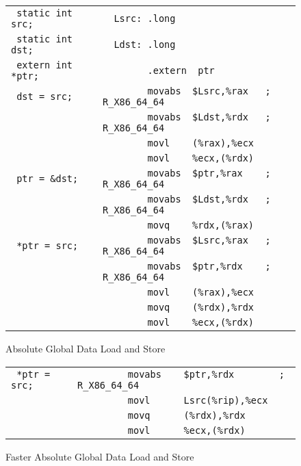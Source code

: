 \begin{figure}[H]
\Hrule
\caption{Absolute Global Data Load and Store}\label{large_abs_data_load_store}
\begin{center}
\begin{footnotesize}
\begin{tabular}{|l|l|}
\hline
\verb# static int src;  # & \verb#  Lsrc: .long                # \\
\verb# static int dst;  # & \verb#  Ldst: .long                # \\
\verb# extern int *ptr; # & \verb#        .extern  ptr         # \\
\hline
\verb# dst = src;       # & \verb#        movabs  $Lsrc,%rax   ; R_X86_64_64 # \\
\verb#                  # & \verb#        movabs  $Ldst,%rdx   ; R_X86_64_64 # \\
\verb#                  # & \verb#        movl    (%rax),%ecx  # \\
\verb#                  # & \verb#        movl    %ecx,(%rdx)  # \\
\hline
\verb# ptr = &dst;      # & \verb#        movabs  $ptr,%rax    ; R_X86_64_64 # \\
\verb#                  # & \verb#        movabs  $Ldst,%rdx   ; R_X86_64_64 # \\
\verb#                  # & \verb#        movq    %rdx,(%rax)  # \\
\hline
\verb# *ptr = src;      # & \verb#        movabs  $Lsrc,%rax   ; R_X86_64_64 # \\
\verb#                  # & \verb#        movabs  $ptr,%rdx    ; R_X86_64_64 # \\
\verb#                  # & \verb#        movl    (%rax),%ecx  # \\
\verb#                  # & \verb#        movq    (%rdx),%rdx  # \\ 
\verb#                  # & \verb#        movl    %ecx,(%rdx)  # \\
\hline
\end{tabular}
\end{footnotesize}
\end{center}
\end{figure}
            
\begin{figure}[H]
\Hrule
\caption{Faster Absolute Global Data Load and Store}
\label{large_rip_rel_addr_abs}
\begin{center}
\begin{footnotesize}
\begin{tabular}{|l|l|}
\hline
\verb# *ptr = src; # & \verb#         movabs    $ptr,%rdx        ; R_X86_64_64 # \\
\verb#             # & \verb#         movl      Lsrc(%rip),%ecx  # \\
\verb#             # & \verb#         movq      (%rdx),%rdx      # \\
\verb#             # & \verb#         movl      %ecx,(%rdx)      # \\
\hline
\end{tabular} %
\end{footnotesize}
\end{center}
\end{figure}

